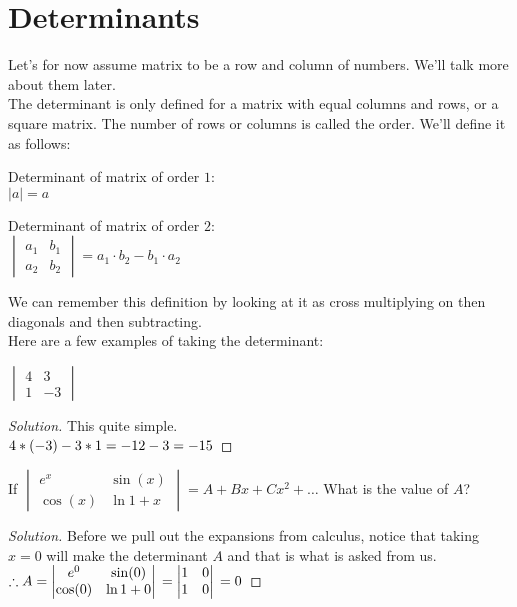 \section{Determinants}
Let's for now assume matrix to be a row and column of numbers. We'll talk more about them later.\\
The determinant is only defined for a matrix with equal columns and rows, or a square matrix. The number of rows or columns is called the order. We'll define it as follows:\\
\begin{definition}
    Determinant of matrix of order $1$:\\
    $|a| = a$
\end{definition}
\begin{definition}
    Determinant of matrix of order $2$:\\
    $\begin{vmatrix}
        a_1 & b_1\\
        a_2 & b_2
    \end{vmatrix} = a_1\cdot b_2 - b_1\cdot a_2$
\end{definition}
We can remember this definition by looking at it as cross multiplying on then diagonals and then  subtracting.\\
Here are a few examples of taking the determinant:\\
\begin{example}
    $\begin{vmatrix}
        4 & 3\\
        1 & -3
    \end{vmatrix}$
\end{example}
\begin{proof}
    [Solution]
    This quite simple. \\
    $4*(-3)-3*1\\
    = -12 -3\\
    = -15$
\end{proof}
\begin{example}
    If $\begin{vmatrix}
        e^x & \sin(x)\\
        \cos(x) & \ln{1+x}
    \end{vmatrix} = A + Bx + Cx^2+\dots$  What is the value of  $A$?
\end{example}
\begin{proof}
    [Solution]
    Before we pull out the expansions from calculus, notice that taking $x=0$ will make the determinant $A$ and that is what is asked from us.\\
    $\therefore A= \begin{vmatrix}
        e^0 & \sin(0)\\
        \cos(0) & \ln{1+0}
    \end{vmatrix}\\
    = \begin{vmatrix}
        1 & 0\\
        1 & 0
    \end{vmatrix}\\
    = 0$
\end{proof}
